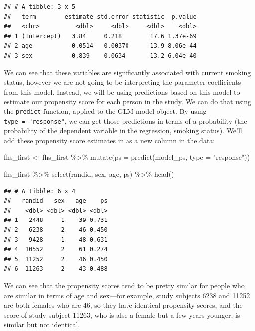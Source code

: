 \documentclass[
]{book}
\newenvironment{Shaded}{\begin{snugshade}}{\end{snugshade}}
\newcommand{\AttributeTok}[1]{\textcolor[rgb]{0.77,0.63,0.00}{#1}}
\newcommand{\FunctionTok}[1]{\textcolor[rgb]{0.00,0.00,0.00}{#1}}
\newcommand{\NormalTok}[1]{#1}
\newcommand{\OtherTok}[1]{\textcolor[rgb]{0.56,0.35,0.01}{#1}}
\newcommand{\SpecialCharTok}[1]{\textcolor[rgb]{0.00,0.00,0.00}{#1}}
\newcommand{\StringTok}[1]{\textcolor[rgb]{0.31,0.60,0.02}{#1}}
\begin{document}
\begin{verbatim}
## # A tibble: 3 x 5
##   term        estimate std.error statistic  p.value
##   <chr>          <dbl>     <dbl>     <dbl>    <dbl>
## 1 (Intercept)   3.84     0.218        17.6 1.37e-69
## 2 age          -0.0514   0.00370     -13.9 8.06e-44
## 3 sex          -0.839    0.0634      -13.2 6.04e-40
\end{verbatim}

We can see that these variables are significantly associated with current smoking status, however we are not going to be interpreting the parameter coefficients from this model. Instead, we will be using predictions based on this model to estimate our propensity score for each person in the study. We can do that using the \texttt{predict} function, applied to the GLM model object. By using \texttt{type\ =\ "response"}, we can get those predictions in terms of a probability (the probability of the dependent variable in the regression, smoking status). We'll add these propensity score estimates in as a new column in the data:

\begin{Shaded}
\begin{Highlighting}[]
\NormalTok{fhs\_first }\OtherTok{\textless{}{-}}\NormalTok{ fhs\_first }\SpecialCharTok{\%\textgreater{}\%} 
  \FunctionTok{mutate}\NormalTok{(}\AttributeTok{ps =} \FunctionTok{predict}\NormalTok{(model\_ps, }\AttributeTok{type =} \StringTok{"response"}\NormalTok{))}

\NormalTok{fhs\_first }\SpecialCharTok{\%\textgreater{}\%} 
  \FunctionTok{select}\NormalTok{(randid, sex, age, ps) }\SpecialCharTok{\%\textgreater{}\%} 
  \FunctionTok{head}\NormalTok{()}
\end{Highlighting}
\end{Shaded}

\begin{verbatim}
## # A tibble: 6 x 4
##   randid   sex   age    ps
##    <dbl> <dbl> <dbl> <dbl>
## 1   2448     1    39 0.731
## 2   6238     2    46 0.450
## 3   9428     1    48 0.631
## 4  10552     2    61 0.274
## 5  11252     2    46 0.450
## 6  11263     2    43 0.488
\end{verbatim}

We can see that the propensity scores tend to be pretty similar for people who are similar in terms of age and sex---for example, study subjects 6238 and 11252 are both females who are 46, so they have identical propensity scores, and the score of study subject 11263, who is also a female but a few years younger, is similar but not identical.
\end{document}
